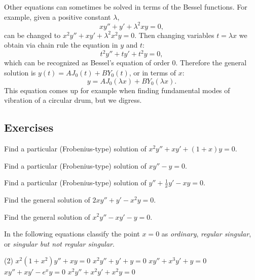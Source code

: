 \begin{example}
Other equations can sometimes be solved in terms of the Bessel functions.
For example, given a positive constant $\lambda$,
\begin{equation*}
x y'' + y' + \lambda^2 x y = 0 ,
\end{equation*}
can be changed to 
$x^2 y'' + x y' + \lambda^2 x^2 y = 0$.  Then changing variables
$t = \lambda x$ we obtain via chain rule the equation in $y$ and $t$:
\begin{equation*}
t^2 y'' + t y' + t^2 y = 0 ,
\end{equation*}
which can be recognized as Bessel's equation of order 0.  Therefore the
general solution is $y(t) = A J_0(t) + B Y_0(t)$, or in terms of $x$:
\begin{equation*}
y = A J_0(\lambda x) + B Y_0(\lambda x) .
\end{equation*}
This equation comes up for example when finding fundamental modes of
vibration of a circular drum, but we digress.
\end{example}

\subsection{Exercises}

\begin{exercise}
Find a particular (Frobenius-type) solution of $x^2 y'' + x y' + (1+x) y = 0$.
\end{exercise}

\begin{exercise}
Find a particular (Frobenius-type) solution of $x y'' - y = 0$.
\end{exercise}

\begin{exercise}
Find a particular (Frobenius-type) solution of $y'' +\frac{1}{x}y' - xy = 0$.
\end{exercise}

\begin{exercise}
Find the general solution of $2 x y'' + y' - x^2 y = 0$.
\end{exercise}

\begin{exercise}
Find the general solution of $x^2 y'' - x y' -y = 0$.
\end{exercise}

\begin{exercise}
In the following equations
classify the point $x=0$ as \emph{ordinary}, \emph{regular singular}, or
\emph{singular but not regular singular}.
\begin{tasks}(2)
\task $x^2(1+x^2)y''+xy=0$
\task $x^2y''+y'+y=0$
\task $xy''+x^3y'+y=0$
\task $xy''+xy'-e^xy=0$
\task $x^2y''+x^2y'+x^2y=0$
\end{tasks}
\end{exercise}

